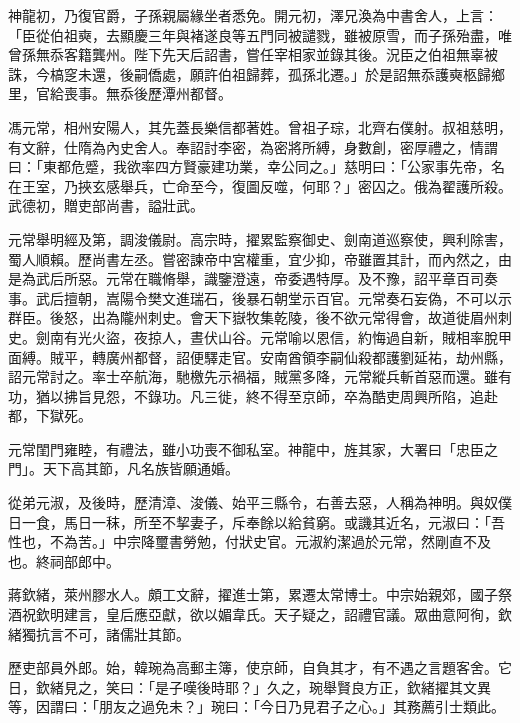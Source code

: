\begin{pinyinscope}
 神龍初，乃復官爵，子孫親屬緣坐者悉免。開元初，澤兄渙為中書舍人，上言：「臣從伯祖奭，去顯慶三年與褚遂良等五門同被譴戮，雖被原雪，而子孫殆盡，唯曾孫無忝客籍龔州。陛下先天后詔書，嘗任宰相家並錄其後。況臣之伯祖無辜被誅，今槁窆未還，後嗣僑處，願許伯祖歸葬，孤孫北遷。」於是詔無忝護奭柩歸鄉里，官給喪事。無忝後歷潭州都督。



 馮元常，相州安陽人，其先蓋長樂信都著姓。曾祖子琮，北齊右僕射。叔祖慈明，有文辭，仕隋為內史舍人。奉詔討李密，為密將所縛，身數創，密厚禮之，情謂曰：「東都危蹙，我欲率四方賢豪建功業，幸公同之。」慈明曰：「公家事先帝，名在王室，乃挾玄感舉兵，亡命至今，復圖反噬，何耶？」密囚之。俄為翟護所殺。武德初，贈吏部尚書，謚壯武。



 元常舉明經及第，調浚儀尉。高宗時，擢累監察御史、劍南道巡察使，興利除害，蜀人順賴。歷尚書左丞。嘗密諫帝中宮權重，宜少抑，帝雖置其計，而內然之，由是為武后所惡。元常在職脩舉，識鑒澄遠，帝委遇特厚。及不豫，詔平章百司奏事。武后擅朝，嵩陽令樊文進瑞石，後暴石朝堂示百官。元常奏石妄偽，不可以示群臣。後怒，出為隴州刺史。會天下嶽牧集乾陵，後不欲元常得會，故道徙眉州刺史。劍南有光火盜，夜掠人，晝伏山谷。元常喻以恩信，約悔過自新，賊相率脫甲面縛。賊平，轉廣州都督，詔便驛走官。安南酋領李嗣仙殺都護劉延祐，劫州縣，詔元常討之。率士卒航海，馳檄先示禍福，賊黨多降，元常縱兵斬首惡而還。雖有功，猶以拂旨見怨，不錄功。凡三徙，終不得至京師，卒為酷吏周興所陷，追赴都，下獄死。



 元常閨門雍睦，有禮法，雖小功喪不御私室。神龍中，旌其家，大署曰「忠臣之門」。天下高其節，凡名族皆願通婚。



 從弟元淑，及後時，歷清漳、浚儀、始平三縣令，右善去惡，人稱為神明。與奴僕日一食，馬日一秣，所至不挈妻子，斥奉餘以給貧窮。或譏其近名，元淑曰：「吾性也，不為苦。」中宗降璽書勞勉，付狀史官。元淑約潔過於元常，然剛直不及也。終祠部郎中。



 蔣欽緒，萊州膠水人。頗工文辭，擢進士第，累遷太常博士。中宗始親郊，國子祭酒祝欽明建言，皇后應亞獻，欲以媚韋氏。天子疑之，詔禮官議。眾曲意阿徇，欽緒獨抗言不可，諸儒壯其節。



 歷吏部員外郎。始，韓琬為高郵主簿，使京師，自負其才，有不遇之言題客舍。它日，欽緒見之，笑曰：「是子嘆後時耶？」久之，琬舉賢良方正，欽緒擢其文異等，因謂曰：「朋友之過免未？」琬曰：「今日乃見君子之心。」其務薦引士類此。




\end{pinyinscope}
